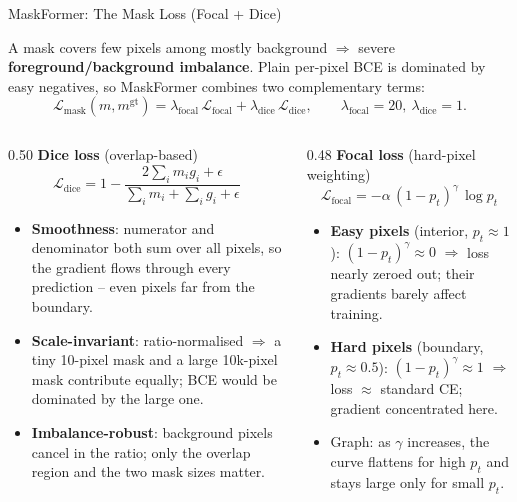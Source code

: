 \begin{frame}{MaskFormer: The Mask Loss (Focal + Dice)}

  A mask covers few pixels among mostly background $\Rightarrow$ severe \textbf{foreground/background imbalance}. Plain per-pixel BCE is dominated by easy negatives, so MaskFormer combines two complementary terms:
  \[
    \mathcal{L}_\text{mask}(m, m^{\text{gt}}) = \lambda_\text{focal}\,\mathcal{L}_\text{focal} + \lambda_\text{dice}\,\mathcal{L}_\text{dice},
    \qquad \lambda_\text{focal}=20,\ \lambda_\text{dice}=1.
  \]

  \begin{columns}[t]
    \begin{column}{0.50\textwidth}
      \textbf{Dice loss} (overlap-based)
      \[
        \mathcal{L}_\text{dice} = 1 - \frac{2\sum_i m_i g_i + \epsilon}{\sum_i m_i + \sum_i g_i + \epsilon}
      \]
      \begin{itemize}\small
        \item \textbf{Smoothness}: numerator and denominator both sum over all pixels, so the gradient flows through every prediction -- even pixels far from the boundary.
        \item \textbf{Scale-invariant}: ratio-normalised $\Rightarrow$ a tiny 10-pixel mask and a large 10k-pixel mask contribute equally; BCE would be dominated by the large one.
        \item \textbf{Imbalance-robust}: background pixels cancel in the ratio; only the overlap region and the two mask sizes matter.
      \end{itemize}
    \end{column}
    \begin{column}{0.48\textwidth}
      \textbf{Focal loss} (hard-pixel weighting)
      \[
        \mathcal{L}_\text{focal} = -\alpha\,(1{-}p_t)^{\gamma}\,\log p_t
      \]
      \begin{itemize}\small
        \item \textbf{Easy pixels} (interior, $p_t \approx 1$): $(1-p_t)^\gamma \approx 0$ $\Rightarrow$ loss nearly zeroed out; their gradients barely affect training.
        \item \textbf{Hard pixels} (boundary, $p_t \approx 0.5$): $(1-p_t)^\gamma \approx 1$ $\Rightarrow$ loss $\approx$ standard CE; gradient concentrated here.
        \item Graph: as $\gamma$ increases, the curve flattens for high $p_t$ and stays large only for small $p_t$.

\end{itemize}
\end{column}
\end{columns}
\end{frame}
